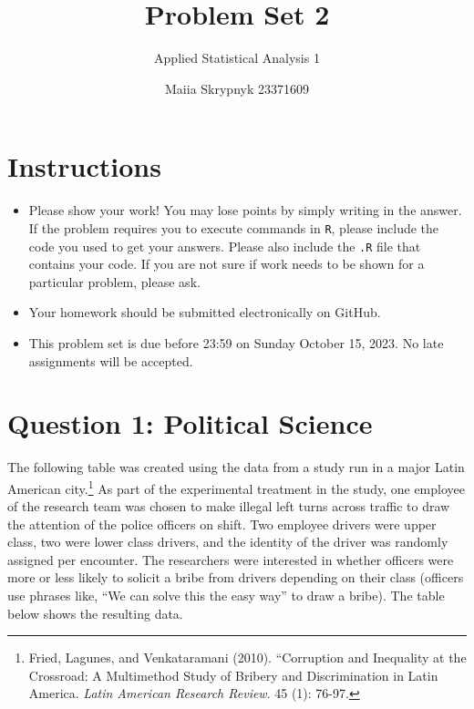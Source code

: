 \documentclass[12pt,letterpaper]{article}
\begin{document}
 
	
\title{Problem Set 2}
\author{Applied Statistical Analysis 1}
\date{Maiia Skrypnyk 23371609}

	\maketitle
	\section*{Instructions}
\begin{itemize}
	\item Please show your work! You may lose points by simply writing in the answer. If the problem requires you to execute commands in \texttt{R}, please include the code you used to get your answers. Please also include the \texttt{.R} file that contains your code. If you are not sure if work needs to be shown for a particular problem, please ask.
	\item Your homework should be submitted electronically on GitHub.
	\item This problem set is due before 23:59 on Sunday October 15, 2023. No late assignments will be accepted.

\end{itemize}

	
	\vspace{.5cm}
	\section*{Question 1: Political Science}
		\vspace{.25cm}
	The following table was created using the data from a study run in a major Latin American city.\footnote{Fried, Lagunes, and Venkataramani (2010). ``Corruption and Inequality at the Crossroad: A Multimethod Study of Bribery and Discrimination in Latin America. \textit{Latin American Research Review}. 45 (1): 76-97.} As part of the experimental treatment in the study, one employee of the research team was chosen to make illegal left turns across traffic to draw the attention of the police officers on shift. Two employee drivers were upper class, two were lower class drivers, and the identity of the driver was randomly assigned per encounter. The researchers were interested in whether officers were more or less likely to solicit a bribe from drivers depending on their class (officers use phrases like, ``We can solve this the easy way'' to draw a bribe). The table below shows the resulting data.
\end{document}
